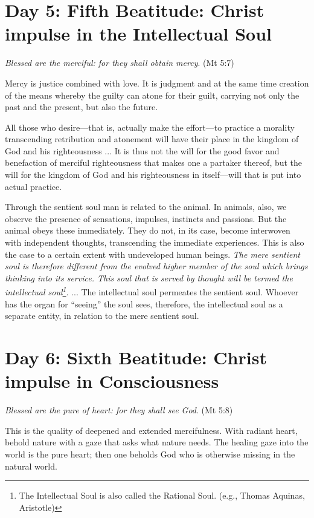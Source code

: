 \section{Day 5: Fifth Beatitude: Christ impulse in the Intellectual Soul}
\emph{Blessed are the merciful: for they shall obtain mercy}. (Mt 5:7)

Mercy is justice combined with love. It is judgment and at the same time creation of the means whereby the guilty can atone for their guilt, carrying not only the past and the present, but also the future.

\begin{quotex}
All those who desire—that is, actually make the effort—to practice a morality transcending retribution and atonement will have their place in the kingdom of God and his righteousness ... It is thus not the will for the good favor and benefaction of merciful righteousness that makes one a partaker thereof, but the will for the kingdom of God and his righteousness in itself—will that is put into actual practice.

\end{quotex}
Through the sentient soul man is related to the animal. In animals, also, we observe the presence of sensations, impulses, instincts and passions. But the animal obeys these immediately. They do not, in its case, become interwoven with independent thoughts, transcending the immediate experiences. This is also the case to a certain extent with undeveloped human beings. \textit{The mere sentient soul is therefore different from the evolved higher member of the soul which brings thinking into its service. This soul that is served by thought will be termed the intellectual soul\footnote{The Intellectual Soul is also called the Rational Soul. (e.g., Thomas Aquinas, Aristotle)}}. ... The intellectual soul permeates the sentient soul. Whoever has the organ for ``seeing'' the soul sees, therefore, the intellectual soul as a separate entity, in relation to the mere sentient soul.

\section{Day 6: Sixth Beatitude: Christ impulse in Consciousness}

\emph{Blessed are the pure of heart: for they shall see God}. (Mt 5:8)

This is the quality of deepened and extended mercifulness. With radiant heart, behold nature with a gaze that asks what nature needs. The healing gaze into the world is the pure heart; then one beholds God who is otherwise missing in the natural world.

